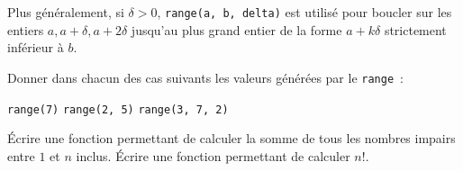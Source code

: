 \documentclass{magnolia}
\begin{document}
Plus généralement, si $\delta > 0$, \verb_range(a, b, delta)_ est utilisé pour boucler sur les entiers $a, a+\delta, a+2\delta$ jusqu'au plus grand entier de la forme $a + k\delta$ strictement inférieur à $b$.
\vspace{2ex}
\begin{exos}
\exo Donner dans chacun des cas suivants les valeurs générées par le \verb_range_~:
\begin{questions}
\question \verb_range(7)_
\question \verb_range(2, 5)_
\question \verb_range(3, 7, 2)_
\end{questions}
\exo Écrire une fonction permettant de calculer la somme de tous les nombres impairs
  entre $1$ et $n$ inclus.
\exo Écrire une fonction permettant de calculer $n!$.
\end{exos}
\bigskip



\end{document}
